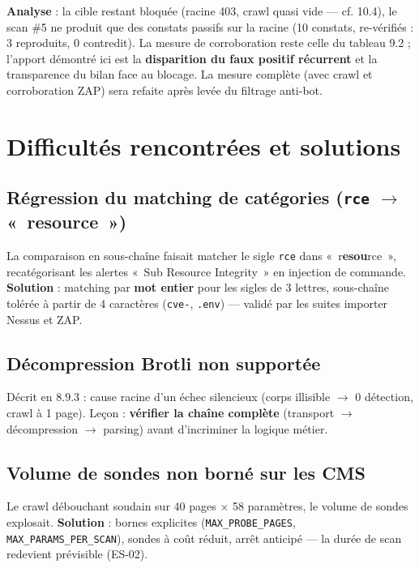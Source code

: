 \documentclass[11pt,a4paper]{report}
\newcommand{\code}[1]{\texttt{#1}}
\begin{document}
\textbf{Analyse} : la cible restant bloquée (racine 403, crawl quasi vide --- cf. 10.4),
le scan \#5 ne produit que des constats passifs sur la racine (10 constats, re-vérifiés :
3 reproduits, 0 contredit). La mesure de corroboration reste celle du tableau 9.2 ;
l'apport démontré ici est la \textbf{disparition du faux positif récurrent} et la
transparence du bilan face au blocage. La mesure complète (avec crawl et corroboration
ZAP) sera refaite après levée du filtrage anti-bot.

\chapter{Difficultés rencontrées et solutions}

\section{Régression du matching de catégories (\code{rce} $\rightarrow$ «~resource~»)}

La comparaison en sous-chaîne faisait matcher le sigle \code{rce} dans
«~r\textbf{esou}rce~», recatégorisant les alertes «~Sub Resource Integrity~» en injection
de commande. \textbf{Solution} : matching par \textbf{mot entier} pour les sigles de
3 lettres, sous-chaîne tolérée à partir de 4 caractères (\code{cve-}, \code{.env}) ---
validé par les suites importer Nessus et ZAP.

\section{Décompression Brotli non supportée}

Décrit en 8.9.3 : cause racine d'un échec silencieux (corps illisible $\rightarrow$ 0
détection, crawl à 1 page). Leçon : \textbf{vérifier la chaîne complète} (transport
$\rightarrow$ décompression $\rightarrow$ parsing) avant d'incriminer la logique métier.

\section{Volume de sondes non borné sur les CMS}

Le crawl débouchant soudain sur 40 pages $\times$ 58 paramètres, le volume de sondes
explosait. \textbf{Solution} : bornes explicites (\code{MAX\_PROBE\_PAGES},
\code{MAX\_PARAMS\_PER\_SCAN}), sondes à coût réduit, arrêt anticipé --- la durée de scan
redevient prévisible (ES-02).
\end{document}

